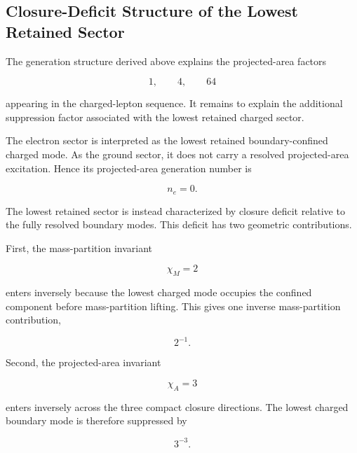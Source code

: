\documentclass[11pt]{article}
\theoremstyle{definition}
\theoremstyle{remark}
\begin{document}

\subsection{Closure-Deficit Structure of the Lowest Retained Sector}
\label{subsec:closure_deficit_lowest_sector}

The generation structure derived above explains the projected-area
factors

\begin{equation}
1,
\qquad
4,
\qquad
64
\end{equation}

appearing in the charged-lepton sequence. It remains to explain
the additional suppression factor associated with the lowest
retained charged sector.

The electron sector is interpreted as the lowest retained
boundary-confined charged mode. As the ground sector, it does
not carry a resolved projected-area excitation. Hence its
projected-area generation number is

\begin{equation}
n_e = 
0.
\end{equation}

The lowest retained sector is instead characterized by closure
deficit relative to the fully resolved boundary modes. This
deficit has two geometric contributions.

First, the mass-partition invariant

\begin{equation}
\chi_M =
2
\end{equation}

enters inversely because the lowest charged mode occupies the
confined component before mass-partition lifting. This gives one
inverse mass-partition contribution,

\begin{equation}
2^{-1}.
\end{equation}

Second, the projected-area invariant

\begin{equation}
\chi_A = 3
\end{equation}

enters inversely across the three compact closure directions.
The lowest charged boundary mode is therefore suppressed by

\begin{equation}
3^{-3}.
\end{equation}
\end{document}
